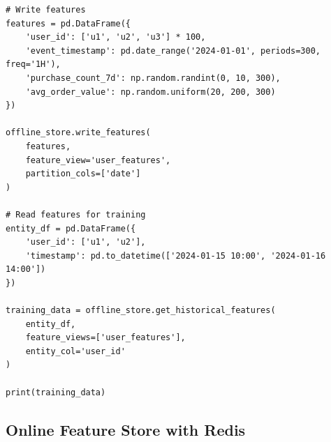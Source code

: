 \begin{lstlisting}[style=python, caption=Scalable offline feature store with partitioning]
# Write features
features = pd.DataFrame({
    'user_id': ['u1', 'u2', 'u3'] * 100,
    'event_timestamp': pd.date_range('2024-01-01', periods=300, freq='1H'),
    'purchase_count_7d': np.random.randint(0, 10, 300),
    'avg_order_value': np.random.uniform(20, 200, 300)
})

offline_store.write_features(
    features,
    feature_view='user_features',
    partition_cols=['date']
)

# Read features for training
entity_df = pd.DataFrame({
    'user_id': ['u1', 'u2'],
    'timestamp': pd.to_datetime(['2024-01-15 10:00', '2024-01-16 14:00'])
})

training_data = offline_store.get_historical_features(
    entity_df,
    feature_views=['user_features'],
    entity_col='user_id'
)

print(training_data)
\end{lstlisting}

\subsection{Online Feature Store with Redis}

